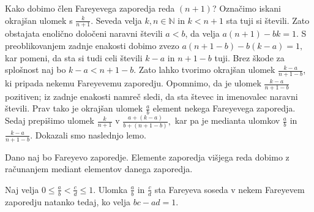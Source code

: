 \documentclass[mat1]{fmfdelo}
\begin{document}
%
Kako dobimo člen Fareyevega zaporedja reda $(n+1)$?
Označimo iskani okrajšan ulomek s $\frac{k}{n+1}$. Seveda velja $k, n \in\mathbb{N}$ in $k < n+1$ sta tuji si števili. Zato obstajata enolično določeni naravni števili $a < b$, da velja $a(n+1)-bk=1.$ S preoblikovanjem zadnje enakosti dobimo zvezo $a(n+1-b)-b(k-a)=1,$ kar pomeni, da sta si tudi celi števili $k-a$ in $n+1-b$ tuji. Brez škode za splošnost naj bo $k-a<n+1-b.$ Zato lahko tvorimo okrajšan ulomek $\frac{k-a}{n+1-b}$, ki pripada nekemu Fareyevemu zaporedju. Opomnimo, da je ulomek $\frac{k-a}{n+1-b}$ pozitiven; iz zadnje enakosti namreč sledi, da sta števec in imenovalec naravni števili. Prav tako je okrajšan ulomek $\frac{a}{b}$ element nekega Fareyevega zaporedja. Sedaj prepišimo ulomek $\frac{k}{n+1}$ v $\frac{a+(k-a)}{b+(n+1-b)},$ kar pa je medianta ulomkov $\frac{a}{b}$ in $\frac{k-a}{n+1-b}.$ Dokazali smo naslednjo lemo.

\begin{lema}
\label{lema:EltVišReda}
Dano naj bo Fareyevo zaporedje. Elemente zaporedja višjega reda dobimo z računanjem mediant elementov danega zaporedja.
\end{lema}

\begin{trditev}
Naj velja \( 0 \leq \frac{a}{b} < \frac{c}{d} \leq 1\). Ulomka $\frac{a}{b}$ in $\frac{c}{d}$ sta Fareyeva soseda v nekem Fareyevem zaporedju natanko tedaj, ko velja \(bc - ad = 1\).
\end{trditev}
\end{document}
